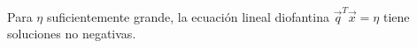 \begin{corollary}
	Para $\eta$ suficientemente grande, la ecuación lineal diofantina $\vec{q}^T\vec{x} = \eta$
	tiene soluciones no negativas.
\end{corollary}

% 

